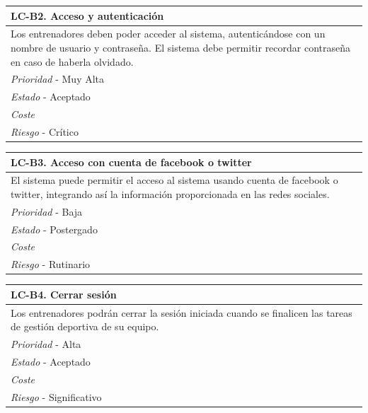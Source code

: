 	\begin{center}
		\begin{tabularx}{15cm}{|X|}
			\hline 
				\bf{LC-B2. Acceso y autenticación}\\
			\hline
				Los entrenadores deben poder acceder al sistema, autenticándose con un nombre de usuario y contraseña. El sistema debe permitir recordar contraseña en caso de haberla olvidado.\\
			\hline
				{\it Prioridad} - Muy Alta\\
			\hline
				{\it Estado} - Aceptado\\
			\hline
				{\it Coste}\\
			\hline
				{\it Riesgo} - Crítico\\
			\hline
		\end{tabularx}
	\end{center}

	\begin{center}
		\begin{tabularx}{15cm}{|X|}
			\hline 
				\bf{LC-B3. Acceso con cuenta de facebook o twitter}\\
			\hline
				El sistema puede permitir el acceso al sistema usando cuenta de facebook o twitter, integrando así la información proporcionada en las redes sociales.\\
			\hline
				{\it Prioridad} - Baja\\
			\hline
				{\it Estado} - Postergado\\
			\hline
				{\it Coste}\\
			\hline
				{\it Riesgo} - Rutinario\\
			\hline
		\end{tabularx}
	\end{center}
	
	\begin{center}
		\begin{tabularx}{15cm}{|X|}
			\hline 
				\bf{LC-B4. Cerrar sesión}\\
			\hline
				Los entrenadores podrán cerrar la sesión iniciada cuando se finalicen las tareas de gestión deportiva de su equipo.\\
			\hline
				{\it Prioridad} - Alta\\
			\hline
				{\it Estado} - Aceptado\\
			\hline
				{\it Coste}\\
			\hline
				{\it Riesgo} - Significativo\\
			\hline
		\end{tabularx}
	\end{center}
	
